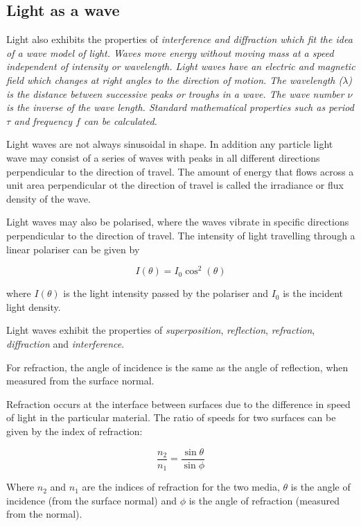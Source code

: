 \subsection{Light as a wave}

Light also exhibits the properties of \em{interference} and \em{diffraction} which fit the idea of a wave model of light. Waves move energy without moving mass at a speed independent of intensity or wavelength. Light waves have an electric and magnetic field which changes at right angles to the direction of motion. The wavelength ($\lambda$) is the distance between successive peaks or troughs in a wave. The wave number $\nu$ is the inverse of the wave length. Standard mathematical properties such as period $\tau$ and frequency $f$ can be calculated. 

Light waves are not always sinusoidal in shape. In addition any particle light wave may consist of a series of waves with peaks in all different directions perpendicular to the direction of travel. The amount of energy that flows across a unit area perpendicular ot the direction of travel is called the irradiance or flux density of the wave. 

Light waves may also be polarised, where the waves vibrate in specific directions perpendicular to the direction of travel. The intensity of light travelling through a linear polariser can be given by 

\begin{equation}
I(\theta) = I_0\cos^2(\theta)
\end{equation}

where $I(\theta)$ is the light intensity passed by the polariser and $I_0$ is the incident light density. 

Light waves exhibit the properties of {\em superposition}, {\em reflection}, {\em refraction}, {\em diffraction} and {\em interference}.

For refraction, the angle of incidence is the same as the angle of reflection, when measured from the surface normal. 

Refraction occurs at the interface between surfaces due to the difference in speed of light in the particular material. The ratio of speeds for two surfaces can be given by the index of refraction:

\begin{equation}
	\frac{n_2}{n_1} = \frac{\sin\theta}{\sin\phi}
\end{equation}

Where $n_2$ and $n_1$ are the indices of refraction for the two media, $\theta$ is the angle of incidence (from the surface normal) and $\phi$ is the angle of refraction (measured from the normal). 

